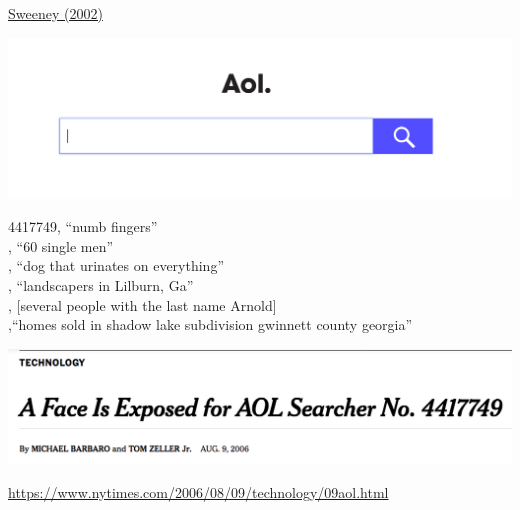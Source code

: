 \documentclass{beamer}
\begin{document}
\begin{frame}

\begin{center}
\end{center}

\vfill
\href{http://dx.doi.org/10.1142/S0218488502001648}{Sweeney (2002)}

\end{frame}
\begin{frame}

\begin{center}
\includegraphics[width=\textwidth]{figures/aol_search}
\end{center}

\end{frame}
\begin{frame}

4417749, ``numb fingers'' \\ , ``60 single men'' \\ , ``dog that urinates on everything'' \\ , ``landscapers in Lilburn, Ga'' \\ ,  [several people with the last name Arnold] \\ ,``homes sold in shadow lake subdivision gwinnett county georgia''\\

\end{frame}
\begin{frame}

\begin{center}
\includegraphics[width=\textwidth]{figures/barbaro_face_2006_title}
\end{center}

\vfill

\tiny{\url{https://www.nytimes.com/2006/08/09/technology/09aol.html}}

\end{frame}
\end{document}
